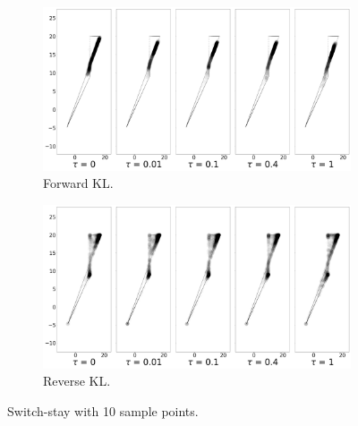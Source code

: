 \documentclass{article}
\begin{document}
\begin{figure}[!htb]
  \centering
  \begin{subfigure}[b]{0.5\linewidth}
    \centering
    \includegraphics[width=0.8\columnwidth]{figs/continuous-switch-stay/monte-carlo/10/polytope_forward_adam_lr=0.005.png}
    \caption{Forward KL.}
    \label{fig:10-sample-switch-stay-forward}
  \end{subfigure}%
  \begin{subfigure}[b]{0.5\linewidth}
        \centering
        \includegraphics[width=0.8\columnwidth]{figs/continuous-switch-stay/monte-carlo/10/polytope_reverse_adam_lr=0.005.png}
        \caption{Reverse KL.}
        \label{fig:10-sample-switch-stay-reverse}
  \end{subfigure}
  \caption{Switch-stay with 10 sample points.}
\end{figure}
\end{document}
